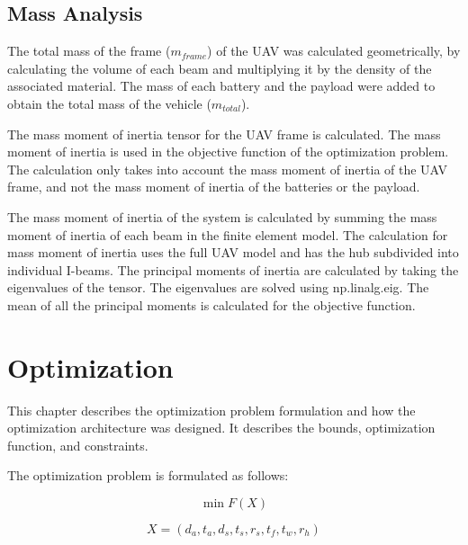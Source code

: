 \documentclass[doublespace,nopageskip]{VTthesis}
\begin{document}
	
	
	\section{Mass Analysis} \label{se:mass}
		
		The total mass of the frame ($m_{frame}$) of the UAV was calculated geometrically, by calculating the volume of each beam and multiplying it by the density of the associated material. The mass of each battery and the payload were added to obtain the total mass of the vehicle ($m_{total}$). 
		
		The mass moment of inertia tensor for the UAV frame is calculated. The mass moment of inertia is used in the objective function of the optimization problem. The calculation only takes into account the mass moment of inertia of the UAV frame, and not the mass moment of inertia of the batteries or the payload. %
		
		The mass moment of inertia of the system is calculated by summing the mass moment of inertia of each beam in the finite element model. The calculation for mass moment of inertia uses the full UAV model and has the hub subdivided into individual I-beams. The principal moments of inertia are calculated by taking the eigenvalues of the tensor. The eigenvalues are solved using np.linalg.eig. The mean of all the principal moments is calculated for the objective function.
	 
	
	\chapter{Optimization} \label{ch:optimization}
	
		
		 
		 This chapter describes the optimization problem formulation and how the optimization architecture was designed. It describes the bounds, optimization function, and constraints. 
		 		 
		 The optimization problem is formulated as follows:
		 
		 \begin{equation}
		 	\min F(X)
		 	\label{eq:opt_objective}
		 \end{equation}
		
		 \begin{equation}
		 	
		 	X = (d_a,t_a,d_s,t_s,r_s,t_f,t_w,r_h)
		 	\label{eq:opt_dvs}
		 \end{equation}
		 
\end{document}
